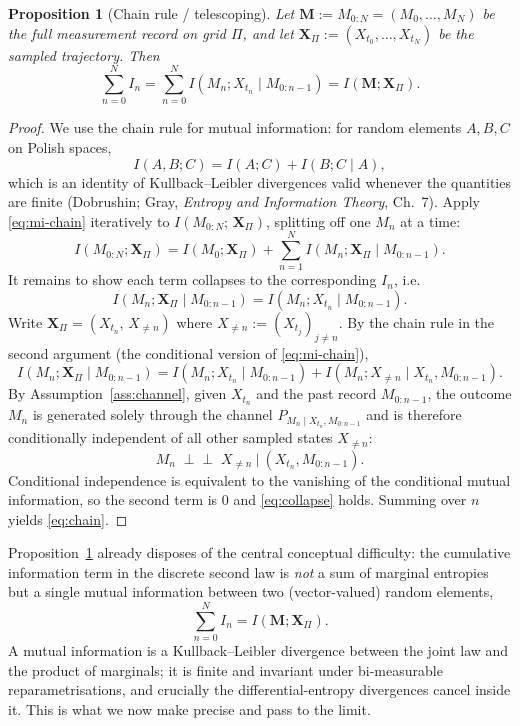 \documentclass{amsart}
\newtheorem{proposition}{Proposition}
\theoremstyle{definition}
\theoremstyle{remark}
\begin{document}
\begin{proposition}[Chain rule / telescoping]\label{prop:chain}
Let $\mathbf M:=M_{0:N}=(M_0,\dots,M_N)$ be the full measurement record on
grid $\Pi$, and let $\mathbf X_\Pi:=(X_{t_0},\dots,X_{t_N})$ be the
sampled trajectory. Then
\begin{equation}\label{eq:chain}
\sum_{n=0}^{N}I_n
=\sum_{n=0}^{N} I\!\left(M_n;X_{t_n}\mid M_{0:n-1}\right)
= I\!\left(\mathbf M;\mathbf X_\Pi\right).
\end{equation}
\end{proposition}

\begin{proof}
We use the chain rule for mutual information: for random elements
$A,B,C$ on Polish spaces,
\begin{equation}\label{eq:mi-chain}
I(A,B;C)=I(A;C)+I(B;C\mid A),
\end{equation}
which is an identity of Kullback--Leibler divergences valid whenever the
quantities are finite (Dobrushin; Gray, \emph{Entropy and Information
Theory}, Ch.~7). Apply \eqref{eq:mi-chain} iteratively to
$I(M_{0:N};\,\mathbf X_\Pi)$, splitting off one $M_n$ at a time:
\[
I(M_{0:N};\mathbf X_\Pi)
= I(M_0;\mathbf X_\Pi)+\sum_{n=1}^{N} I(M_n;\mathbf X_\Pi\mid M_{0:n-1}).
\]
It remains to show each term collapses to the corresponding $I_n$, i.e.
\begin{equation}\label{eq:collapse}
I(M_n;\mathbf X_\Pi\mid M_{0:n-1}) = I(M_n;X_{t_n}\mid M_{0:n-1}).
\end{equation}
Write $\mathbf X_\Pi=(X_{t_n},\,X_{\neq n})$ where
$X_{\neq n}:=(X_{t_j})_{j\ne n}$. By the chain rule in the second
argument (the conditional version of \eqref{eq:mi-chain}),
\[
I(M_n;\mathbf X_\Pi\mid M_{0:n-1})
=I(M_n;X_{t_n}\mid M_{0:n-1})
+I\!\left(M_n;X_{\neq n}\mid X_{t_n},M_{0:n-1}\right).
\]
By Assumption~\ref{ass:channel}, given $X_{t_n}$ and the past record
$M_{0:n-1}$, the outcome $M_n$ is generated solely through the channel
$P_{M_n\mid X_{t_n},M_{0:n-1}}$ and is therefore conditionally
independent of all other sampled states $X_{\neq n}$:
\[
M_n \;\perp\!\!\!\perp\; X_{\neq n}\ \big|\ (X_{t_n},M_{0:n-1}).
\]
Conditional independence is equivalent to the vanishing of the
conditional mutual information, so the second term is $0$ and
\eqref{eq:collapse} holds. Summing over $n$ yields \eqref{eq:chain}.
\end{proof}

Proposition~\ref{prop:chain} already disposes of the central conceptual
difficulty: the cumulative information term in the discrete second law is
\emph{not} a sum of marginal entropies but a single mutual information
between two (vector-valued) random elements,
\[
\sum_{n=0}^N I_n = I(\mathbf M;\mathbf X_\Pi).
\]
A mutual information is a Kullback--Leibler divergence between the joint
law and the product of marginals; it is finite and invariant under
bi-measurable reparametrisations, and crucially the differential-entropy
divergences cancel inside it. This is what we now make precise and pass
to the limit.
\end{document}
